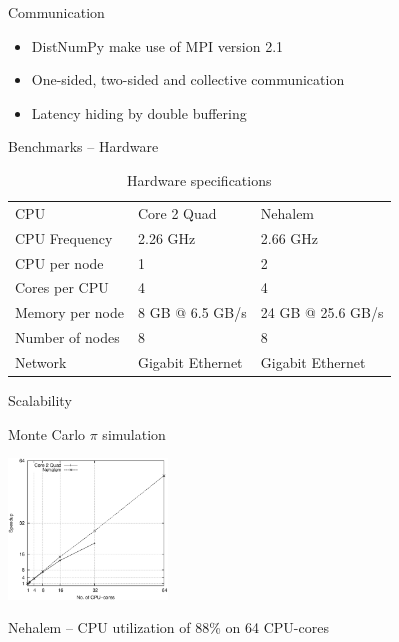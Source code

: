 \documentclass{beamer}
\begin{document}

\begin{frame}{Communication}
\begin{itemize}
  \item DistNumPy make use of MPI version 2.1
  \item One-sided, two-sided and collective communication
  \item Latency hiding by double buffering
\end{itemize}
\end{frame}


\begin{frame}{Benchmarks -- Hardware}
\begin{center}
\end{center}

\begin{table}
\caption{Hardware specifications}
\centering
\begin{tabular}{|lll|}
\hline
CPU & Core 2 Quad & Nehalem\\
CPU Frequency & 2.26 GHz & 2.66 GHz\\
CPU per node & 1 & 2\\
Cores per CPU & 4 & 4\\
Memory per node & 8 GB @ 6.5 GB/s & 24 GB @ 25.6 GB/s\\
Number of nodes & 8 & 8\\
Network & Gigabit Ethernet & Gigabit Ethernet\\
\hline
\end{tabular}
\label{tab:specs}
\end{table}
\end{frame}


\begin{frame}{Scalability}
\begin{center}
Monte Carlo $\pi$ simulation

\vspace{10px}
\includegraphics[width=160px]{../gfx/MonteCarloStrong}
\vspace{3px}

\begin{scriptsize}
Nehalem -- CPU utilization of 88\% on 64 CPU-cores
\end{scriptsize}
\end{center}

\end{frame}
\end{document}
